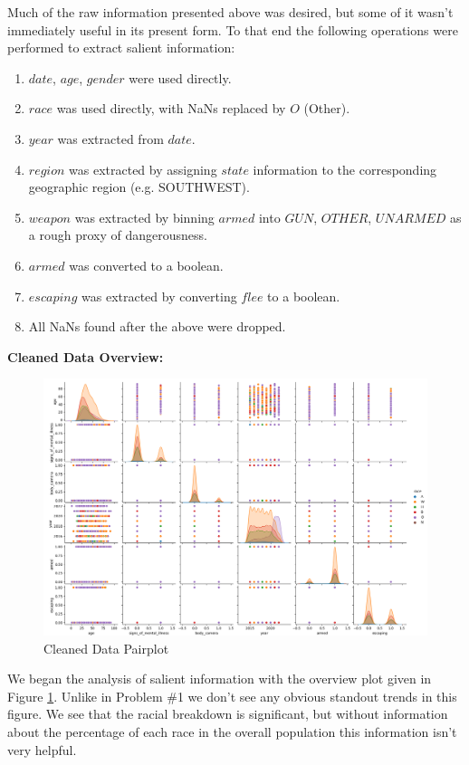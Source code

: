 \documentclass[12pt]{article}
\begin{document}
\begin{enumerate}[leftmargin=\labelsep]
  Much of the raw information presented above was desired, but some of it wasn't immediately useful in its present form.
  To that end the following operations were performed to extract salient information:
  \begin{enumerate}
    \item $date$, $age$, $gender$ were used directly.
    \item $race$ was used directly, with NaNs replaced by $O$ (Other).
    \item $year$ was extracted from $date$.
    \item $region$ was extracted by assigning $state$ information to the corresponding geographic region (e.g. SOUTHWEST).
    \item $weapon$ was extracted by binning $armed$ into $GUN$, $OTHER$, $UNARMED$ as a rough proxy of dangerousness.
    \item $armed$ was converted to a boolean.
    \item $escaping$ was extracted by converting $flee$ to a boolean.
    \item All NaNs found after the above were dropped.
  \end{enumerate}

  \textbf{Cleaned Data Overview:}

  \begin{figure}[htb]
    \begin{center}
      \includegraphics[width=\textwidth]{media/p2_pairplot.png}
    \end{center}
    \caption{Cleaned Data Pairplot}
    \label{fig:p2_pairplot}
  \end{figure}
  
  We began the analysis of salient information with the overview plot given in Figure \ref{fig:p2_pairplot}.
  Unlike in Problem \#1 we don't see any obvious standout trends in this figure. We see that the racial
  breakdown is significant, but without information about the percentage of each race in the overall population
  this information isn't very helpful.
  

\end{enumerate}
\end{document}
